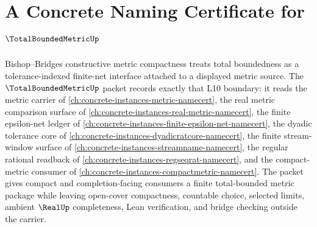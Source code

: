 \chapter{A Concrete Naming Certificate for $\TotalBoundedMetricUp$}
\label{ch:concrete-instances-totally-bounded-metric-namecert}

Bishop--Bridges constructive metric compactness treats total boundedness as a tolerance-indexed finite-net interface attached to a displayed metric source. The $\TotalBoundedMetricUp$ packet records exactly that L10 boundary: it reads the metric carrier of \autoref{ch:concrete-instances-metric-namecert}, the real metric comparison surface of \autoref{ch:concrete-instances-real-metric-namecert}, the finite epsilon-net ledger of \autoref{ch:concrete-instances-finite-epsilon-net-namecert}, the dyadic tolerance core of \autoref{ch:concrete-instances-dyadicratcore-namecert}, the finite stream-window surface of \autoref{ch:concrete-instances-streamname-namecert}, the regular rational readback of \autoref{ch:concrete-instances-regseqrat-namecert}, and the compact-metric consumer of \autoref{ch:concrete-instances-compactmetric-namecert}. The packet gives compact and completion-facing consumers a finite total-bounded metric package while leaving open-cover compactness, countable choice, selected limits, ambient $\RealUp$ completeness, Lean verification, and bridge checking outside the carrier.

